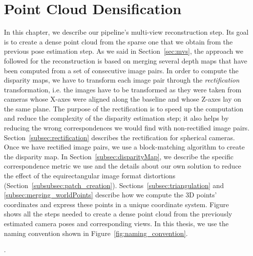 \section{Point Cloud Densification}
\label{sec:pipeline_densification}
In this chapter, we describe our pipeline's multi-view reconstruction step.
Its goal is to create a dense point cloud from the sparse one that we obtain
from the previous pose estimation step.
As we said in Section~\ref{sec:mvs}, the approach we followed for the
reconstruction is based on merging several depth maps that have been computed
from a set of consecutive image pairs.
In order to compute the disparity maps, we have to transform each image pair
through the \emph{rectification} transformation, i.e. the images have to be
transformed as they were taken from cameras whose X-axes were aligned along the
baseline and whose Z-axes lay on the same plane.
The purpose of the rectification is to speed up the computation and reduce the 
complexity of the disparity estimation step; it also helps by
reducing the wrong correspondences we would find with
non-rectified image pairs. Section~\ref{subsec:rectification} describes the
rectification for spherical cameras.
Once we have rectified image pairs, we use a block-matching algorithm to create
the disparity map. In Section~\ref{subsec:disparityMap}, we describe
the specific correspondence metric we use and the details about our own
solution to reduce the effect of the equirectangular image format distortions
(Section~\ref{subsubsec:patch_creation}).
Sections~\ref{subsec:triangulation} and \ref{subsec:merging_worldPoints}
describe how we compute the 3D points' coordinates and express these points in
a unique coordinate system.
Figure~ shows all the steps needed to
create a dense point cloud from the previously estimated camera poses and
corresponding views.
In this thesis, we use the naming convention shown in
Figure~\ref{fig:naming_convention}.

.

